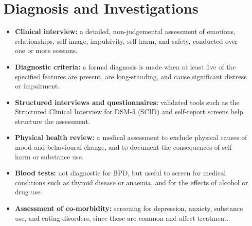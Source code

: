 \section*{Diagnosis and Investigations}
\begin{itemize}
    \item \textbf{Clinical interview:} a detailed, non-judgemental assessment of emotions, relationships, self-image, impulsivity, self-harm, and safety, conducted over one or more sessions.
    \item \textbf{Diagnostic criteria:} a formal diagnosis is made when at least five of the specified features are present, are long-standing, and cause significant distress or impairment.
    \item \textbf{Structured interviews and questionnaires:} validated tools such as the Structured Clinical Interview for DSM-5 (SCID) and self-report screens help structure the assessment.
    \item \textbf{Physical health review:} a medical assessment to exclude physical causes of mood and behavioural change, and to document the consequences of self-harm or substance use.
    \item \textbf{Blood tests:} not diagnostic for BPD, but useful to screen for medical conditions such as thyroid disease or anaemia, and for the effects of alcohol or drug use.
    \item \textbf{Assessment of co-morbidity:} screening for depression, anxiety, substance use, and eating disorders, since these are common and affect treatment.
\end{itemize}

